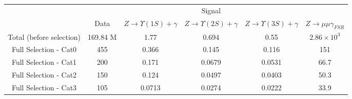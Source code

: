 

\begin{tabular}{c|c|c|c|c|c}
\hline
\hline

&  &  \multicolumn{3}{c|}{Signal} &    \\
\cline{3-5}
& Data & $Z \rightarrow \Upsilon(1S)+\gamma$ & $Z \rightarrow \Upsilon(2S)+\gamma$ & $Z \rightarrow \Upsilon(3S)+\gamma$ &  $Z \rightarrow \mu\mu\gamma_{FSR}$  \\
\hline
Total (before selection) & 169.84 M &  1.77 & 0.694 & 0.55 & $2.86 \times 10^{3}$  \\
\hline\hline
Full Selection - Cat0 & 455  &  0.366 &  0.145 &  0.116 &  151  \\
Full Selection - Cat1 & 200  &  0.171 &  0.0679 &  0.0531 &  66.7  \\
Full Selection - Cat2 & 150  &  0.124 &  0.0497 &  0.0403 &  50.3  \\
Full Selection - Cat3 & 105  &  0.0713 &  0.0274 &  0.0222 &  33.9 \\

\end{tabular}

